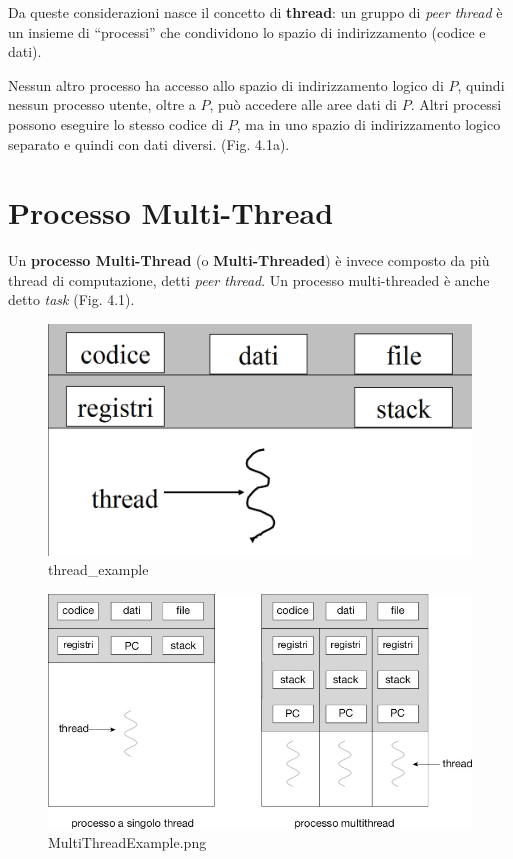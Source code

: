 Da queste considerazioni nasce il concetto di \textbf{thread}: un gruppo di \textit{peer thread} è un insieme di “processi” che condividono lo spazio di indirizzamento (codice e dati).


Nessun altro processo ha accesso allo spazio di indirizzamento logico di $P$, quindi nessun processo utente, oltre a $P$, può accedere alle aree dati di $P$. Altri processi possono eseguire lo stesso codice di $P$, ma in uno spazio di indirizzamento logico separato e quindi con dati diversi. (Fig. 4.1a).

\section{Processo Multi-Thread}
Un \textbf{processo Multi-Thread} (o \textbf{Multi-Threaded}) è invece composto da più thread di computazione, detti \textit{peer thread}. Un processo multi-threaded è anche detto \textit{task} (Fig. 4.1).
\begin{figure}[h] \centering \includegraphics[width=0.50\linewidth]{images/thread_example.png} \caption{thread\_example} \label{fig:4.1a} \end{figure}

\begin{figure}[h] \centering \includegraphics[width=0.50\linewidth]{images/MultiThreadExample.png} \caption{MultiThreadExample.png} \label{fig:4.2} \end{figure}

